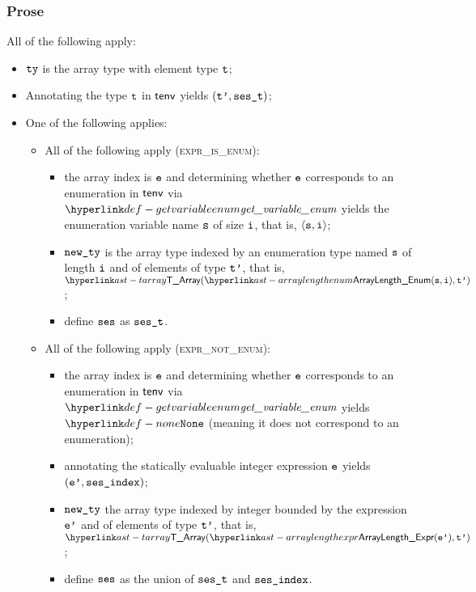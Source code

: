 \subsubsection{Prose}
All of the following apply:
\begin{itemize}
  \item $\texttt{ty}$ is the array type with element type $\texttt{t}$;
  \item Annotating the type $\texttt{t}$ in $\textsf{tenv}$ yields $(\texttt{t'}, \texttt{ses\_t})$\ProseOrTypeError;
  \item One of the following applies:
  \begin{itemize}
    \item All of the following apply (\textsc{expr\_is\_enum}):
    \begin{itemize}
      \item the array index is $\texttt{e}$ and determining whether $\texttt{e}$ corresponds to an enumeration in $\textsf{tenv}$
      via $\getvariableenum$ yields the enumeration variable
      name $\texttt{s}$ of size $\texttt{i}$, that is, $\langle \texttt{s}, \texttt{i} \rangle$\ProseOrTypeError;
      \item $\texttt{new\_ty}$ is the array type indexed by an enumeration type
      named $\texttt{s}$ of length $\texttt{i}$ and of elements of type $\texttt{t'}$, that is, $\TArray(\ArrayLengthEnum(\vs, \vi), \vtp)$;
      \item define $\texttt{ses}$ as $\texttt{ses\_t}$.
    \end{itemize}

    \item All of the following apply (\textsc{expr\_not\_enum}):
    \begin{itemize}
      \item the array index is $\texttt{e}$ and determining whether $\texttt{e}$ corresponds to an enumeration in $\textsf{tenv}$
      via $\getvariableenum$ yields $\None$ (meaning it does not
      correspond to an enumeration)\ProseOrTypeError;
      \item annotating the statically evaluable integer expression $\texttt{e}$ yields\\
      $(\texttt{e'}, \texttt{ses\_index})$\ProseOrTypeError;
      \item $\texttt{new\_ty}$ the array type indexed by integer bounded by
      the expression $\texttt{e'}$ and of elements of type $\texttt{t'}$, that is,
      $\TArray(\ArrayLengthExpr(\vep), \vtp)$;
      \item define $\texttt{ses}$ as the union of $\texttt{ses\_t}$ and $\texttt{ses\_index}$.
    \end{itemize}
  \end{itemize}
\end{itemize}
